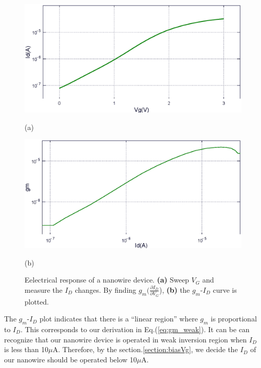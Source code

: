 \begin{figure}[!htbp]
    \centering
    \begin{minipage}[t]{1\textwidth}
        \centering
        \includegraphics[width=1\textwidth]{images/chapter3/pIdVg.eps}
        \raggedright
        (a)
    \end{minipage}
    \hfill
    \begin{minipage}[t]{1\textwidth}
        \centering
        \includegraphics[width=1\textwidth]{images/chapter3/pIdgbs.eps}
        \raggedright
        (b)
    \end{minipage}
    \caption{Eelectrical response of a nanowire device. \textbf{(a)} Sweep $V_G$ and measure the $I_D$ changes. By finding $g_m (\frac{\partial I_D}{\partial V_G}$), \textbf{(b)} the $g_m$-$I_D$ curve is plotted.}
    \label{fig:pIdVg}
\end{figure}

The $g_m$-$I_D$ plot indicates that there is a ``linear region'' where $g_m$ is proportional to $I_D$.
This corresponds to our derivation in Eq.(\ref{eq:gm_weak}).
It can be can recognize that our nanowire device is operated in weak inversion region when $I_D$ is less than 10$\mu$A.
Therefore, by the section.\ref{section:biasVg}, we decide the $I_D$ of our nanowire should be operated below 10$\mu$A.

